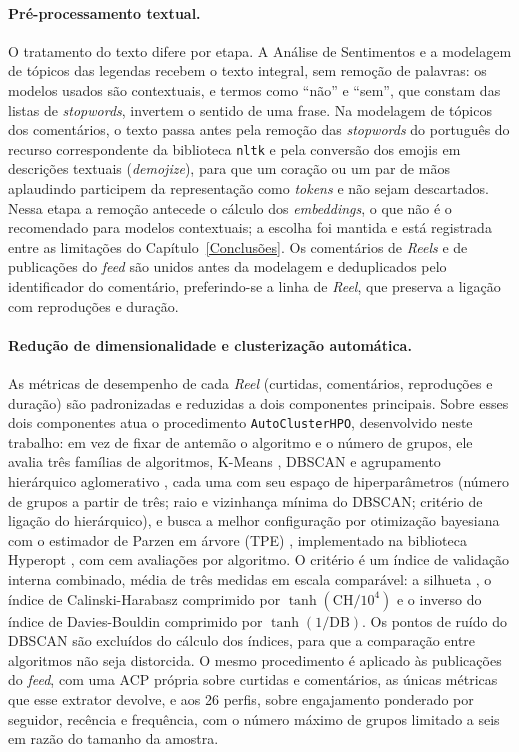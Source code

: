 \paragraph*{Pré-processamento textual.} O tratamento do texto difere por etapa. A Análise de Sentimentos e a modelagem de tópicos das legendas recebem o texto integral, sem remoção de palavras: os modelos usados são contextuais, e termos como ``não'' e ``sem'', que constam das listas de \emph{stopwords}, invertem o sentido de uma frase. Na modelagem de tópicos dos comentários, o texto passa antes pela remoção das \emph{stopwords} do português do recurso correspondente da biblioteca \texttt{nltk} \cite{bird2009} e pela conversão dos emojis em descrições textuais (\emph{demojize}), para que um coração ou um par de mãos aplaudindo participem da representação como \emph{tokens} e não sejam descartados. Nessa etapa a remoção antecede o cálculo dos \emph{embeddings}, o que não é o recomendado para modelos contextuais; a escolha foi mantida e está registrada entre as limitações do Capítulo~\ref{Conclusões}. Os comentários de \emph{Reels} e de publicações do \emph{feed} são unidos antes da modelagem e deduplicados pelo identificador do comentário, preferindo-se a linha de \emph{Reel}, que preserva a ligação com reproduções e duração.

\paragraph*{Redução de dimensionalidade e clusterização automática.} As métricas de desempenho de cada \emph{Reel} (curtidas, comentários, reproduções e duração) são padronizadas e reduzidas a dois componentes principais. Sobre esses dois componentes atua o procedimento \texttt{AutoClusterHPO}, desenvolvido neste trabalho: em vez de fixar de antemão o algoritmo e o número de grupos, ele avalia três famílias de algoritmos, K-Means \cite{macqueen1967}, DBSCAN \cite{ester1996} e agrupamento hierárquico aglomerativo \cite{tan2006}, cada uma com seu espaço de hiperparâmetros (número de grupos a partir de três; raio e vizinhança mínima do DBSCAN; critério de ligação do hierárquico), e busca a melhor configuração por otimização bayesiana com o estimador de Parzen em árvore (TPE) \cite{bergstra2011}, implementado na biblioteca Hyperopt \cite{bergstra2013}, com cem avaliações por algoritmo. O critério é um índice de validação interna combinado, média de três medidas em escala comparável: a silhueta \cite{rousseeuw1987}, o índice de Calinski-Harabasz \cite{calinski1974} comprimido por $\tanh(\mathrm{CH}/10^{4})$ e o inverso do índice de Davies-Bouldin \cite{davies1979} comprimido por $\tanh(1/\mathrm{DB})$. Os pontos de ruído do DBSCAN são excluídos do cálculo dos índices, para que a comparação entre algoritmos não seja distorcida. O mesmo procedimento é aplicado às publicações do \emph{feed}, com uma ACP própria sobre curtidas e comentários, as únicas métricas que esse extrator devolve, e aos 26 perfis, sobre engajamento ponderado por seguidor, recência e frequência, com o número máximo de grupos limitado a seis em razão do tamanho da amostra.

